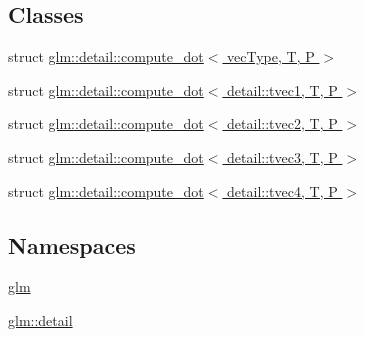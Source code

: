 \subsection*{Classes}
\begin{DoxyCompactItemize}
\item 
struct \hyperlink{structglm_1_1detail_1_1compute__dot}{glm\+::detail\+::compute\+\_\+dot$<$ vec\+Type, T, P $>$}
\item 
struct \hyperlink{structglm_1_1detail_1_1compute__dot_3_01detail_1_1tvec1_00_01_t_00_01_p_01_4}{glm\+::detail\+::compute\+\_\+dot$<$ detail\+::tvec1, T, P $>$}
\item 
struct \hyperlink{structglm_1_1detail_1_1compute__dot_3_01detail_1_1tvec2_00_01_t_00_01_p_01_4}{glm\+::detail\+::compute\+\_\+dot$<$ detail\+::tvec2, T, P $>$}
\item 
struct \hyperlink{structglm_1_1detail_1_1compute__dot_3_01detail_1_1tvec3_00_01_t_00_01_p_01_4}{glm\+::detail\+::compute\+\_\+dot$<$ detail\+::tvec3, T, P $>$}
\item 
struct \hyperlink{structglm_1_1detail_1_1compute__dot_3_01detail_1_1tvec4_00_01_t_00_01_p_01_4}{glm\+::detail\+::compute\+\_\+dot$<$ detail\+::tvec4, T, P $>$}
\end{DoxyCompactItemize}
\subsection*{Namespaces}
\begin{DoxyCompactItemize}
\item 
 \hyperlink{namespaceglm}{glm}
\item 
 \hyperlink{namespaceglm_1_1detail}{glm\+::detail}
\end{DoxyCompactItemize}
